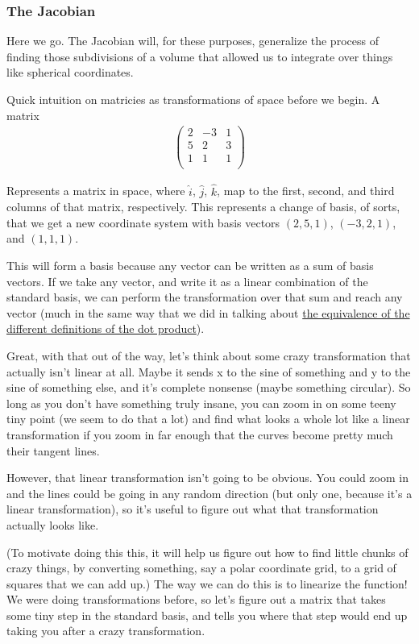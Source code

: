 \documentclass[12pt, letterpaper]{article}
\begin{document}
\subsubsection{The Jacobian}
Here we go. 
The Jacobian will, for these purposes, generalize the process of finding those subdivisions of a volume that allowed us to integrate over things like spherical coordinates.

Quick intuition on matricies as transformations of space before we begin.
A matrix
\begin{gather*}
    \begin{pmatrix}
        2 & -3 & 1\\
        5 & 2 & 3\\
        1 & 1 & 1\\
    \end{pmatrix}
\end{gather*}

Represents a matrix in space, where $\hat{i}$, $\hat{j}$, $\hat{k}$,
map to the first, second, and third columns of that matrix, respectively.
This represents a change of basis, of sorts, that we get a new coordinate system with basis vectors
$(2, 5, 1)$, $(-3, 2, 1)$, and $(1, 1, 1)$.

This will form a basis because any vector can be written as a sum of basis vectors.
If we take any vector, and write it as a linear combination of the standard basis, we can perform the transformation over that sum and reach any vector
(much in the same way that we did in talking about \hyperref[equOfDotProductDefinitions]{the equivalence of the different definitions of the dot product}).

Great, with that out of the way, let's think about some crazy transformation that actually isn't linear at all.
Maybe it sends x to the sine of something and y to the sine of something else, and it's complete nonsense (maybe something circular).
So long as you don't have something truly insane, you can zoom in on some teeny tiny point (we seem to do that a lot)
and find what looks a whole lot like a linear transformation if you zoom in far enough that the curves become pretty much their tangent lines.

However, that linear transformation isn't going to be obvious. 
You could zoom in and the lines could be going in any random direction (but only one, because it's a linear transformation), so it's useful to figure out what that transformation actually looks like.

(To motivate doing this this, it will help us figure out how to find little chunks of crazy things, by converting something, say a polar coordinate grid, to a grid of squares that we can add up.)
The way we can do this is to linearize the function!
We were doing transformations before, so let's figure out a matrix that takes some tiny step in the standard basis, and tells you where that step would end up taking you after a crazy transformation.
\end{document}
